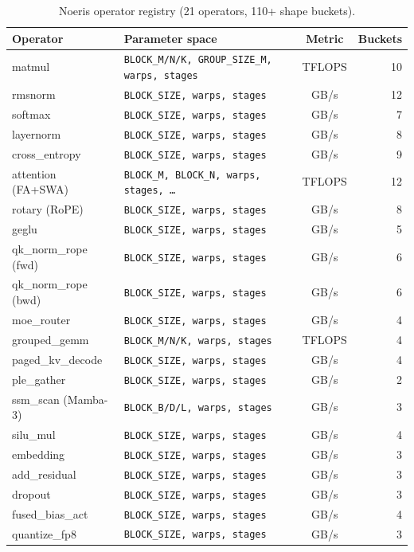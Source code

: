 \documentclass[11pt]{article}
\begin{document}
\begin{table}[t]
\centering
\caption{Noeris operator registry (21 operators, 110+ shape buckets).}
\label{tab:operators}
\small
\begin{tabular}{@{}llcr@{}}
\toprule
Operator & Parameter space & Metric & Buckets \\
\midrule
matmul & \texttt{BLOCK\_M/N/K, GROUP\_SIZE\_M, warps, stages} & TFLOPS & 10 \\
rmsnorm & \texttt{BLOCK\_SIZE, warps, stages} & GB/s & 12 \\
softmax & \texttt{BLOCK\_SIZE, warps, stages} & GB/s & 7 \\
layernorm & \texttt{BLOCK\_SIZE, warps, stages} & GB/s & 8 \\
cross\_entropy & \texttt{BLOCK\_SIZE, warps, stages} & GB/s & 9 \\
attention (FA+SWA) & \texttt{BLOCK\_M, BLOCK\_N, warps, stages, \ldots} & TFLOPS & 12 \\
rotary (RoPE) & \texttt{BLOCK\_SIZE, warps, stages} & GB/s & 8 \\
geglu & \texttt{BLOCK\_SIZE, warps, stages} & GB/s & 5 \\
qk\_norm\_rope (fwd) & \texttt{BLOCK\_SIZE, warps, stages} & GB/s & 6 \\
qk\_norm\_rope (bwd) & \texttt{BLOCK\_SIZE, warps, stages} & GB/s & 6 \\
moe\_router & \texttt{BLOCK\_SIZE, warps, stages} & GB/s & 4 \\
grouped\_gemm & \texttt{BLOCK\_M/N/K, warps, stages} & TFLOPS & 4 \\
paged\_kv\_decode & \texttt{BLOCK\_SIZE, warps, stages} & GB/s & 4 \\
ple\_gather & \texttt{BLOCK\_SIZE, warps, stages} & GB/s & 2 \\
ssm\_scan (Mamba-3) & \texttt{BLOCK\_B/D/L, warps, stages} & GB/s & 3 \\
silu\_mul & \texttt{BLOCK\_SIZE, warps, stages} & GB/s & 4 \\
embedding & \texttt{BLOCK\_SIZE, warps, stages} & GB/s & 3 \\
add\_residual & \texttt{BLOCK\_SIZE, warps, stages} & GB/s & 3 \\
dropout & \texttt{BLOCK\_SIZE, warps, stages} & GB/s & 3 \\
fused\_bias\_act & \texttt{BLOCK\_SIZE, warps, stages} & GB/s & 4 \\
quantize\_fp8 & \texttt{BLOCK\_SIZE, warps, stages} & GB/s & 3 \\
\bottomrule
\end{tabular}
\end{table}
\end{document}
